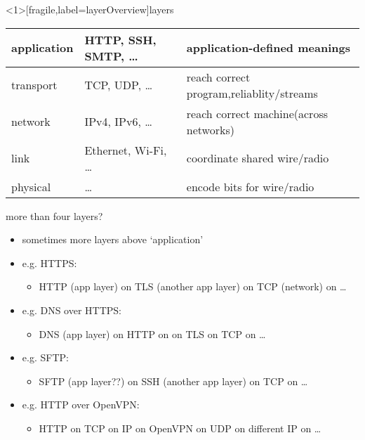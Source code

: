 \begin{frame}<1>[fragile,label=layerOverview]{layers}
\begin{tabular}{|l|l|p{6cm}|} \hline
application & HTTP, SSH, SMTP, \ldots & {application-defined meanings}\\ \hline
transport & TCP, UDP, \ldots & {reach correct program,\linebreak reliablity/streams} \\ \hline
network & IPv4, IPv6, \ldots & {reach correct machine}\linebreak(across networks) \\ \hline
    link & Ethernet, Wi-Fi, \ldots & {coordinate shared wire/radio}\\ \hline
physical & \ldots & encode bits for wire/radio \\ \hline
\end{tabular}
\end{frame}


\begin{frame}{more than four layers?}
    \begin{itemize}
    \item sometimes more layers above `application'
    \item e.g. HTTPS:
        \begin{itemize}
        \item HTTP (app layer) on TLS (another app layer) on TCP (network) on \ldots
        \end{itemize}
    \item e.g. DNS over HTTPS:
        \begin{itemize}
        \item DNS (app layer) on HTTP on on TLS on TCP on \ldots
        \end{itemize}
    \item e.g. SFTP:
        \begin{itemize}
        \item SFTP (app layer??) on SSH (another app layer) on TCP on \ldots
        \end{itemize}
    \item e.g. HTTP over OpenVPN:
        \begin{itemize}
        \item HTTP on TCP on IP on OpenVPN on UDP on different IP on \ldots
        \end{itemize}
    \end{itemize}
\end{frame}
